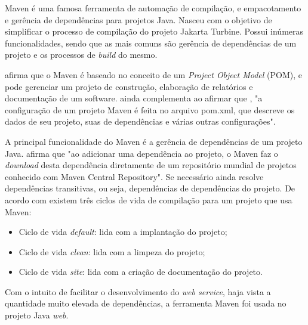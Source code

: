 	
	\par Maven é uma famosa ferramenta de automação de compilação, e empacotamento
e gerência de dependências para projetos Java. Nasceu com o objetivo de
simplificar o processo de compilação do projeto Jakarta Turbine. Possui
inúmeras funcionalidades, sendo que as mais comuns são gerência de dependências
de um projeto e os processos de \textit{build} do mesmo.
	
	\par {} afirma que o Maven é baseado no conceito de
	um \textit{Project Object Model} (POM), e pode gerenciar um projeto de
construção, elaboração de relatórios e documentação de um software.
 ainda complementa ao afirmar que , "a configuração de
um projeto Maven é feita no arquivo pom.xml, que descreve os dados de seu
projeto, suas de dependências e várias outras configurações".
	
	\par A principal funcionalidade do Maven é a gerência de dependências de um
projeto Java.  afirma que "ao adicionar uma dependência
ao projeto, o Maven faz o \textit{download} desta dependência diretamente de
um repositório mundial de projetos  conhecido com Maven Central Repository". Se
necessário ainda resolve dependências transitivas, ou seja, dependências de
dependências do projeto. De acordo com  existem
três ciclos de vida de compilação para um projeto que usa Maven:

	\begin{itemize}
		  \item Ciclo de vida \textit{default}: lida com a implantação do projeto;
		  \item Ciclo de vida \textit{clean}: lida com a limpeza do projeto;
		  \item Ciclo de vida \textit{site}: lida com a criação de documentação
		  do projeto.
	\end{itemize}
	
	\par Com o intuito de facilitar o desenvolvimento do \textit{web service},
haja vista a quantidade muito elevada de dependências, a ferramenta Maven foi
usada no projeto Java \textit{web}.
